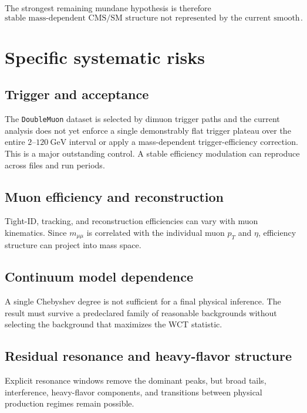 \documentclass[11pt]{article}
\begin{document}
The strongest remaining mundane hypothesis is therefore
\begin{equation}
\boxed{
\text{stable mass-dependent CMS/SM structure not represented by the
current smooth null}.
}
\end{equation}

\section{Specific systematic risks}

\subsection{Trigger and acceptance}

The \texttt{DoubleMuon} dataset is selected by dimuon trigger paths and the
current analysis does not yet enforce a single demonstrably flat trigger
plateau over the entire \(2\)--\(120~\mathrm{GeV}\) interval or apply a
mass-dependent trigger-efficiency correction.  This is a major outstanding
control.  A stable efficiency modulation can reproduce across files and run
periods.

\subsection{Muon efficiency and reconstruction}

Tight-ID, tracking, and reconstruction efficiencies can vary with muon
kinematics.  Since \(m_{\mu\mu}\) is correlated with the individual muon
\(p_T\) and \(\eta\), efficiency structure can project into mass space.

\subsection{Continuum model dependence}

A single Chebyshev degree is not sufficient for a final physical inference.
The result must survive a predeclared family of reasonable backgrounds without
selecting the background that maximizes the WCT statistic.

\subsection{Residual resonance and heavy-flavor structure}

Explicit resonance windows remove the dominant peaks, but broad tails,
interference, heavy-flavor components, and transitions between physical
production regimes remain possible.
\end{document}
